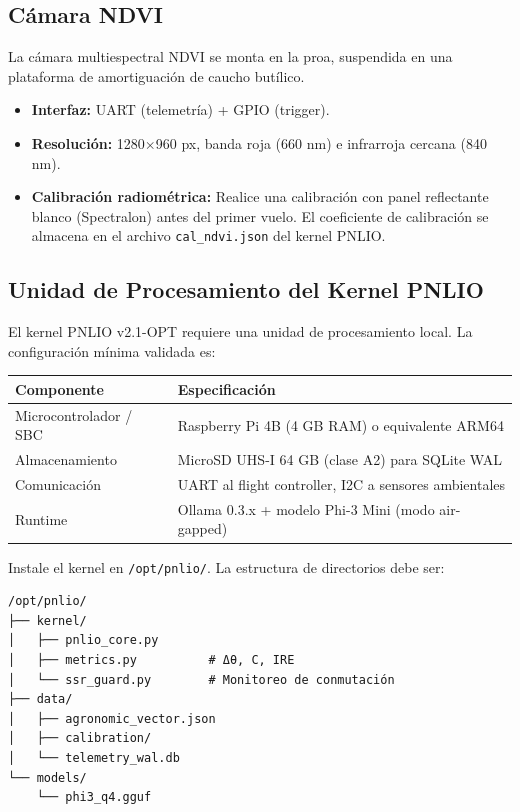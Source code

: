 \subsection{Cámara NDVI}

La cámara multiespectral NDVI se monta en la proa, suspendida en una plataforma de amortiguación de caucho butílico.

\begin{itemize}
    \item \textbf{Interfaz:} UART (telemetría) + GPIO (trigger).
    \item \textbf{Resolución:} 1280$\times$960 px, banda roja (660 nm) e infrarroja cercana (840 nm).
    \item \textbf{Calibración radiométrica:} Realice una calibración con panel reflectante blanco (Spectralon) antes del primer vuelo. El coeficiente de calibración se almacena en el archivo \texttt{cal\_ndvi.json} del kernel PNLIO.
\end{itemize}

\subsection{Unidad de Procesamiento del Kernel PNLIO}

El kernel PNLIO v2.1-OPT requiere una unidad de procesamiento local. La configuración mínima validada es:

\begin{table}[h]
\centering
\begin{tabular}{|l|p{8cm}|}
\hline
\textbf{Componente} & \textbf{Especificación} \\ \hline
Microcontrolador / SBC & Raspberry Pi 4B (4 GB RAM) o equivalente ARM64 \\ \hline
Almacenamiento & MicroSD UHS-I 64 GB (clase A2) para SQLite WAL \\ \hline
Comunicación & UART al flight controller, I2C a sensores ambientales \\ \hline
Runtime & Ollama 0.3.x + modelo Phi-3 Mini (modo air-gapped) \\ \hline
\end{tabular}
\end{table}

Instale el kernel en \texttt{/opt/pnlio/}. La estructura de directorios debe ser:

\begin{verbatim}
/opt/pnlio/
├── kernel/
│   ├── pnlio_core.py
│   ├── metrics.py          # Δθ, C, IRE
│   └── ssr_guard.py        # Monitoreo de conmutación
├── data/
│   ├── agronomic_vector.json
│   ├── calibration/
│   └── telemetry_wal.db
└── models/
    └── phi3_q4.gguf
\end{verbatim}

